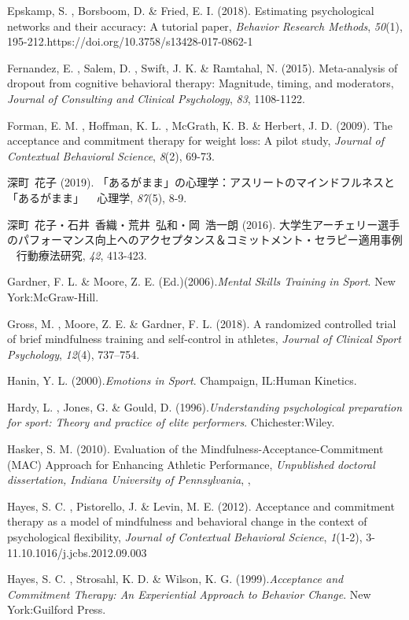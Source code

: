 \documentclass[12pt,a4paper,xelatex,ja=standard]{bxjsarticle}
\begin{document}
Epskamp, S. , Borsboom, D. \& Fried, E. I. (2018). Estimating
psychological networks and their accuracy: A tutorial paper,
\emph{Behavior Research Methods}, \emph{50}(1),
195-212.https://doi.org/10.3758/s13428-017-0862-1

Fernandez, E. , Salem, D. , Swift, J. K. \& Ramtahal, N. (2015).
Meta-analysis of dropout from cognitive behavioral therapy: Magnitude,
timing, and moderators,
\emph{Journal of Consulting and Clinical Psychology}, \emph{83},
1108-1122.

Forman, E. M. , Hoffman, K. L. , McGrath, K. B. \& Herbert, J. D.
(2009). The acceptance and commitment therapy for weight loss: A pilot
study, \emph{Journal of Contextual Behavioral Science}, \emph{8}(2),
69-73.

深町~花子 (2019).
「あるがまま」の心理学：アスリートのマインドフルネスと「あるがまま」 ~
心理学, \emph{87}(5), 8-9.

深町~花子・石井~香織・荒井~弘和・岡~浩一朗 (2016).
大学生アーチェリー選手のパフォーマンス向上へのアクセプタンス＆コミットメント・セラピー適用事例
~ 行動療法研究, \emph{42}, 413-423.

Gardner, F. L. \& Moore, Z. E.
(Ed.)(2006).\emph{Mental Skills Training in Sport}. New
York:McGraw-Hill.

Gross, M. , Moore, Z. E. \& Gardner, F. L. (2018). A randomized
controlled trial of brief mindfulness training and self-control in
athletes, \emph{Journal of Clinical Sport Psychology}, \emph{12}(4),
737--754.

Hanin, Y. L. (2000).\emph{Emotions in Sport}. Champaign, IL:Human
Kinetics.

Hardy, L. , Jones, G. \& Gould, D.
(1996).\emph{Understanding psychological preparation for sport: Theory and practice of elite performers}.
Chichester:Wiley.

Hasker, S. M. (2010). Evaluation of the
Mindfulness-Acceptance-Commitment (MAC) Approach for Enhancing Athletic
Performance,
\emph{Unpublished doctoral dissertation, Indiana University of Pennsylvania},
,

Hayes, S. C. , Pistorello, J. \& Levin, M. E. (2012). Acceptance and
commitment therapy as a model of mindfulness and behavioral change in
the context of psychological flexibility,
\emph{Journal of Contextual Behavioral Science}, \emph{1}(1-2),
3-11.10.1016/j.jcbs.2012.09.003

Hayes, S. C. , Strosahl, K. D. \& Wilson, K. G.
(1999).\emph{Acceptance and Commitment Therapy: An Experiential Approach to Behavior Change}.
New York:Guilford Press.
\end{document}
